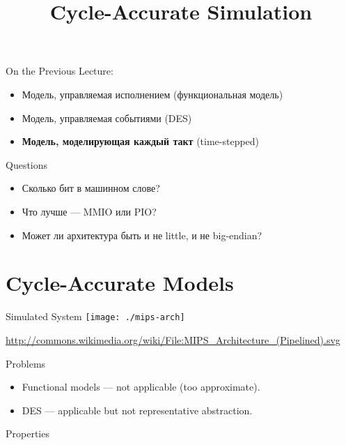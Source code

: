 
\title{Cycle-Accurate Simulation}



\startslides

\begin{frame}{On the Previous Lecture:}
\begin{itemize}
    \item Модель, управляемая исполнением (функциональная модель)
    \item Модель, управляемая событиями (DES)\pause
    \item \textbf{Модель, моделирующая каждый такт} (time-stepped)
\end{itemize}
\end{frame}

\begin{frame}{Questions}
\begin{itemize}
\item Сколько бит в машинном слове? \pause
\item Что лучше — MMIO или PIO?\pause
\item Может ли архитектура быть и не little, и не big-endian?
\end{itemize}
\end{frame}

\section{Cycle-Accurate Models}

\begin{frame}{Simulated System}
\centering
\texttt{[image: ./mips-arch]}

\tiny{\url{http://commons.wikimedia.org/wiki/File:MIPS_Architecture_(Pipelined).svg}}
\end{frame}

\begin{frame}{Problems}
\begin{itemize}
\item Functional models --- not applicable (too approximate).
\item DES --- applicable but not representative abstraction.
\end{itemize}
\vfill
\centering
{}
\end{frame}

\begin{frame}{Properties}
\centering
{}
\end{frame}

